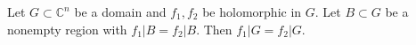 Let $G \subset \mathbb{C}^n$ be a domain and $f_1, f_2$ be holomorphic in $G$. Let $B \subset G$ be a nonempty region with $f_1|B = f_2|B$. Then $f_1|G = f_2|G$.
